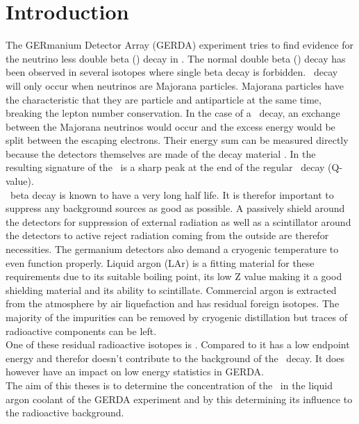 \documentclass[encoding=utf8,british]{tumphthesis}
\begin{document}
\tableofcontents

\mainmatter

\chapter{Introduction}
\label{sec:intro}

The GERmanium Detector Array (GERDA) experiment tries to find evidence for the neutrino less double beta (\onbb) decay in .
The normal double beta (\twonu) decay has been observed in several isotopes where single beta decay is forbidden.
\onbb\ decay will only occur when neutrinos are Majorana particles.
Majorana particles have the characteristic that they are particle and antiparticle at the same time, breaking the lepton number conservation.
In the case of a \onbb\ decay, an exchange between the Majorana neutrinos would occur and the excess energy would be split  between the escaping electrons.
Their energy sum can be measured directly because the detectors themselves are made of the  decay material .
In the resulting signature of the \onbb\ is a sharp peak at the end of the regular \twonu\ decay (Q-value).
\\

\onbb\ beta decay is known to have a  very long half life.
It is therefor important to suppress any background sources as good as possible. 
A passively shield around the detectors for suppression of external radiation as well as a scintillator around the detectors to active reject radiation coming from the outside are therefor necessities.
The germanium detectors also demand a cryogenic temperature to even function properly.
Liquid argon (LAr) is a fitting material for these requirements due to its suitable boiling point, its low Z value making it a good shielding material and its ability to scintillate. 
Commercial argon is extracted from the atmosphere by air liquefaction and has residual foreign isotopes. 
The majority of the impurities can be removed by cryogenic distillation but traces of radioactive components can be left.
\\

One of these residual radioactive isotopes is \Kr. 
Compared to  it has a low endpoint energy and therefor doesn't contribute to the background of the \onbb\ decay.
It does however have an impact on low energy statistics in GERDA.
\\

The aim of this theses is to determine the concentration of the \Kr\ in the liquid argon coolant of the GERDA experiment and by this determining its influence to the radioactive background. 
\\
\end{document}
